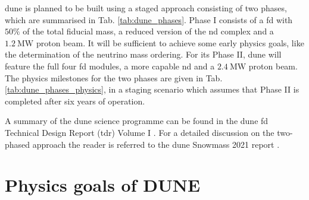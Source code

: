 \gls{dune} is planned to be built using a staged approach consisting of two phases, which are summarised in Tab. \ref{tab:dune_phases}. Phase I consists of a \gls{fd} with $50\%$ of the total fiducial mass, a reduced version of the \gls{nd} complex and a $1.2~\mathrm{MW}$ proton beam. It will be sufficient to achieve some early physics goals, like the determination of the neutrino mass ordering. For its Phase II, \gls{dune} will feature the full four \gls{fd} modules, a more capable \gls{nd} and a $2.4~\mathrm{MW}$ proton beam. The physics milestones for the two phases are given in Tab. \ref{tab:dune_phases_physics}, in a staging scenario which assumes that Phase II is completed after six years of operation.

A summary of the \gls{dune} science programme can be found in the \gls{dune} \gls{fd} Technical Design Report (\gls{tdr}) Volume I \cite{DUNE2020TDR1}. For a detailed discussion on the two-phased approach the reader is referred to the \gls{dune} Snowmass 2021 report \cite{DUNE2022Snowmass}.

\section{Physics goals of DUNE}

